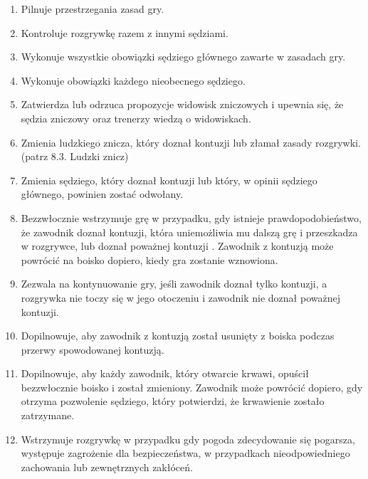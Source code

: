 \documentclass[12pt]{article}
\begin{document}
\begin{enumerate}
	\item Pilnuje przestrzegania zasad gry.

	\item Kontroluje rozgrywkę razem z innymi sędziami.

	\item Wykonuje wszystkie obowiązki sędziego głównego zawarte w zasadach
	      gry.

	\item Wykonuje obowiązki każdego nieobecnego sędziego.

	\item Zatwierdza lub odrzuca propozycje widowisk zniczowych i upewnia się,
	      że sędzia zniczowy oraz trenerzy wiedzą o widowiskach.

	\item Zmienia ludzkiego znicza, który doznał kontuzji lub złamał zasady
	      rozgrywki. (patrz 8.3. Ludzki znicz)

	\item Zmienia sędziego, który doznał kontuzji lub który, w opinii sędziego
	      głównego, powinien zostać odwołany.

	\item Bezzwłocznie wstrzymuje grę w przypadku, gdy istnieje
	      prawdopodobieństwo, że zawodnik doznał kontuzji, która uniemożliwia mu
	      dalszą grę i przeszkadza w rozgrywce, lub doznał poważnej kontuzji .
	      Zawodnik z kontuzją może powrócić na boisko dopiero, kiedy gra zostanie
	      wznowiona.

	\item Zezwala na kontynuowanie gry, jeśli zawodnik doznał tylko kontuzji, a
	      rozgrywka nie toczy się w jego otoczeniu i zawodnik nie doznał poważnej
	      kontuzji.

	\item Dopilnowuje, aby zawodnik z kontuzją został usunięty z boiska podczas
	      przerwy spowodowanej kontuzją.

	\item Dopilnowuje, aby każdy zawodnik, który otwarcie krwawi, opuścił
	      bezzwłocznie boisko i został zmieniony. Zawodnik może powrócić dopiero,
	      gdy otrzyma pozwolenie sędziego, który potwierdzi, że krwawienie zostało
	      zatrzymane.

	\item Wstrzymuje rozgrywkę w przypadku gdy pogoda zdecydowanie się
	      pogarsza, występuje zagrożenie dla bezpieczeństwa, w przypadkach
	      nieodpowiedniego zachowania lub zewnętrznych zakłóceń.


\end{enumerate}
\end{document}
